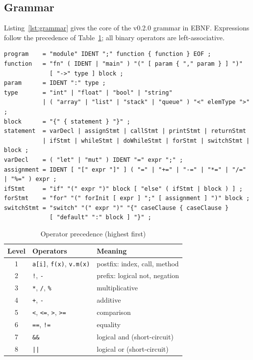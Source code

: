 \documentclass[conference]{IEEEtran}
\newcommand{\cmm}{C\texttt{-{}-}}
\begin{document}
\subsection{Grammar}
Listing~\ref{lst:grammar} gives the core of the v0.2.0 grammar in EBNF. Expressions follow the precedence of
Table~\ref{tab:prec}; all binary operators are left-associative.

\begin{lstlisting}[style=plain,basicstyle=\ttfamily\footnotesize,caption={Core grammar of \cmm{} v0.2.0 (EBNF, abridged).},label={lst:grammar},float=*t]
program    = "module" IDENT ";" function { function } EOF ;
function   = "fn" ( IDENT | "main" ) "(" [ param { "," param } ] ")"
             [ "->" type ] block ;
param      = IDENT ":" type ;
type       = "int" | "float" | "bool" | "string"
           | ( "array" | "list" | "stack" | "queue" ) "<" elemType ">" ;
block      = "{" { statement } "}" ;
statement  = varDecl | assignStmt | callStmt | printStmt | returnStmt
           | ifStmt | whileStmt | doWhileStmt | forStmt | switchStmt | block ;
varDecl    = ( "let" | "mut" ) IDENT "=" expr ";" ;
assignment = IDENT [ "[" expr "]" ] ( "=" | "+=" | "-=" | "*=" | "/=" | "%=" ) expr ;
ifStmt     = "if" "(" expr ")" block [ "else" ( ifStmt | block ) ] ;
forStmt    = "for" "(" forInit [ expr ] ";" [ assignment ] ")" block ;
switchStmt = "switch" "(" expr ")" "{" caseClause { caseClause }
             [ "default" ":" block ] "}" ;
\end{lstlisting}

\begin{table}[t]
\caption{Operator precedence (highest first)}
\label{tab:prec}
\centering
\footnotesize
\begin{tabular}{@{}c l l@{}}
\toprule
\textbf{Level} & \textbf{Operators} & \textbf{Meaning} \\
\midrule
1 & \texttt{a[i]}, \texttt{f(x)}, \texttt{v.m(x)} & postfix: index, call, method \\
2 & \texttt{!}, \texttt{-} & prefix: logical not, negation \\
3 & \texttt{*}, \texttt{/}, \texttt{\%} & multiplicative \\
4 & \texttt{+}, \texttt{-} & additive \\
5 & \texttt{<}, \texttt{<=}, \texttt{>}, \texttt{>=} & comparison \\
6 & \texttt{==}, \texttt{!=} & equality \\
7 & \texttt{\&\&} & logical and (short-circuit) \\
8 & \texttt{||} & logical or (short-circuit) \\
\bottomrule
\end{tabular}
\end{table}
\end{document}
